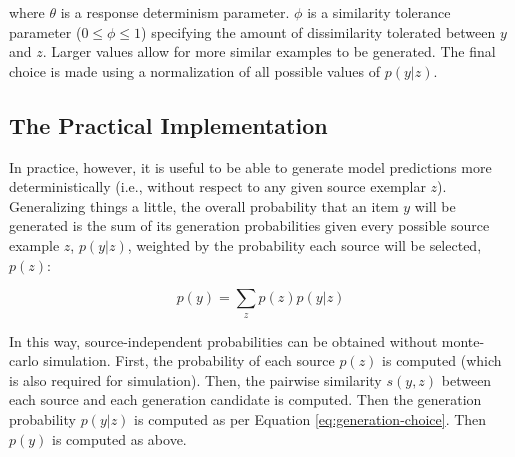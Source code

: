 \documentclass[12pt]{article}
\begin{document}
where $\theta$ is a response determinism parameter. $\phi$ is a similarity tolerance parameter ($0 \leq \phi \leq 1$) specifying the amount of dissimilarity tolerated between $y$ and $z$. Larger values allow for more similar examples to be generated. The final choice is made using a normalization of all possible values of $p(y|z)$.

\subsection*{The Practical Implementation}

In practice, however, it is useful to be able to generate model predictions more deterministically (i.e., without respect to any given source exemplar $z$). Generalizing things a little, the overall probability that an item $y$ will be generated is the sum of its generation probabilities given every possible source example $z$, $p(y|z)$, weighted by the probability each source will be selected, $p(z)$:

\begin{equation}
  p(y) = \sum_z{p(z)p(y|z) }
\end{equation}

In this way, source-independent probabilities can be obtained without monte-carlo simulation. First, the probability of each source $p(z)$ is computed (which is also required for simulation). Then, the pairwise similarity $s(y,z)$ between each source and each generation candidate is computed. Then the generation probability $p(y|z)$ is computed as per Equation \ref{eq:generation-choice}.  Then $p(y)$ is computed as above.
\end{document}
